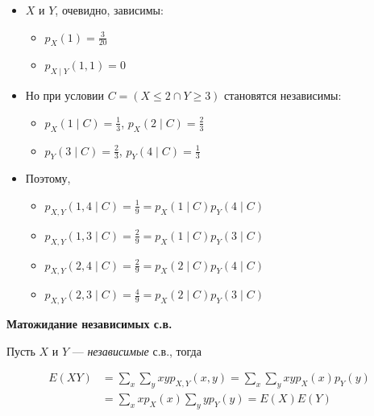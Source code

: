 \documentclass[12pt]{article}
\begin{document}
      \begin{itemize}
        \item $X$ и $Y$, очевидно, зависимы:
        \begin{itemize}
          \item $p_X(1) = \frac{3}{20}$
          \item {$p_{X \mid Y}(1, 1) = 0$}
        \end{itemize}
        \item Но при условии \emph{$C = (X \le 2 \cap Y \ge 3)$} становятся независимы:
        \begin{itemize}
          \setlength\itemsep{2pt}
          \item $p_X(1 \mid C) = \frac{1}{3}$, $p_X(2 \mid C) = \frac{2}{3}$
          \item $p_Y(3 \mid C) = \frac{2}{3}$, $p_Y(4 \mid C) = \frac{1}{3}$ 
        \end{itemize}
        \item Поэтому,
        \begin{itemize}
          \setlength\itemsep{2pt}
          \item $p_{X, Y} (1, 4 \mid C) = \frac{1}{9} = p_X(1 \mid C) p_Y(4 \mid C)$
          \item $p_{X, Y} (1, 3 \mid C) = \frac{2}{9} = p_X(1 \mid C) p_Y(3 \mid C)$
          \item $p_{X, Y} (2, 4 \mid C) = \frac{2}{9} = p_X(2 \mid C) p_Y(4 \mid C)$
          \item $p_{X, Y} (2, 3 \mid C) = \frac{4}{9} = p_X(2 \mid C) p_Y(3 \mid C)$
        \end{itemize}
      \end{itemize}

  




  \textbf{Матожидание независимых с.в.}

  Пусть $X$ и $Y$ --- \emph{независимые} с.в., тогда 
  \begin{center}
  \end{center}

  
  \begin{align*}
    E(XY) &= \sum_x \sum_y xy p_{X, Y}(x , y) = \sum_x \sum_y xy p_X(x) p_Y(y) \\
          &= \sum_x x p_X(x) \sum_y y p_Y(y) = E(X) E(Y)
  \end{align*}
\end{document}
